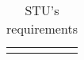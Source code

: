 \begin{longtable}[H]{l p{8cm} l p{2cm}}
                 &                                                                                                                                                                                                                       &                      &                                                                                         \\
    \hline
    \caption{STU's requirements}
\end{longtable}